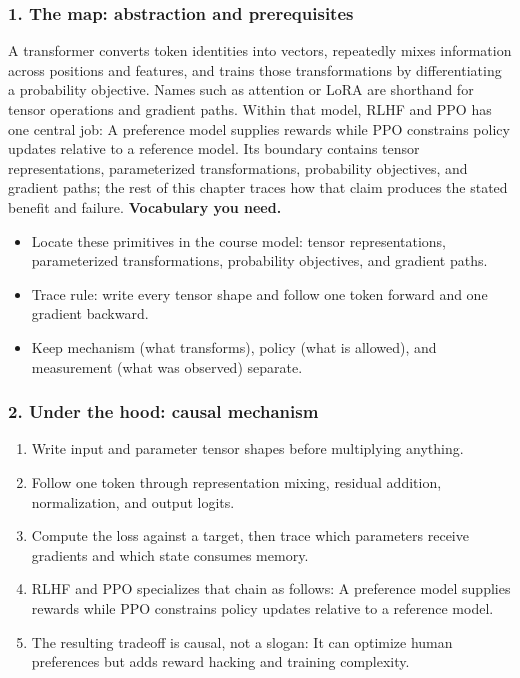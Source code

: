 \subsubsection*{1. The map: abstraction and prerequisites}
A transformer converts token identities into vectors, repeatedly mixes information across positions and features, and trains those transformations by differentiating a probability objective. Names such as attention or LoRA are shorthand for tensor operations and gradient paths.
Within that model, RLHF and PPO has one central job: A preference model supplies rewards while PPO constrains policy updates relative to a reference model. Its boundary contains tensor representations, parameterized transformations, probability objectives, and gradient paths; the rest of this chapter traces how that claim produces the stated benefit and failure.
\textbf{Vocabulary you need.}\begin{itemize}
\item Locate these primitives in the course model: tensor representations, parameterized transformations, probability objectives, and gradient paths.
\item Trace rule: write every tensor shape and follow one token forward and one gradient backward.
\item Keep mechanism (what transforms), policy (what is allowed), and measurement (what was observed) separate.
\end{itemize}
\subsubsection*{2. Under the hood: causal mechanism}\begin{enumerate}
\item Write input and parameter tensor shapes before multiplying anything.
\item Follow one token through representation mixing, residual addition, normalization, and output logits.
\item Compute the loss against a target, then trace which parameters receive gradients and which state consumes memory.
\item RLHF and PPO specializes that chain as follows: A preference model supplies rewards while PPO constrains policy updates relative to a reference model.
\item The resulting tradeoff is causal, not a slogan: It can optimize human preferences but adds reward hacking and training complexity.
\end{enumerate}
